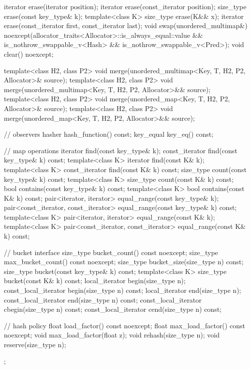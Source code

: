 \begin{codeblock}
{{    iterator  erase(iterator position);
    iterator  erase(const_iterator position);
    size_type erase(const key_type& k);
    template<class K> size_type erase(K&& x);
    iterator  erase(const_iterator first, const_iterator last);
    void      swap(unordered_multimap&)
      noexcept(allocator_traits<Allocator>::is_always_equal::value &&
               is_nothrow_swappable_v<Hash> &&
               is_nothrow_swappable_v<Pred>);
    void      clear() noexcept;

    template<class H2, class P2>
      void merge(unordered_multimap<Key, T, H2, P2, Allocator>& source);
    template<class H2, class P2>
      void merge(unordered_multimap<Key, T, H2, P2, Allocator>&& source);
    template<class H2, class P2>
      void merge(unordered_map<Key, T, H2, P2, Allocator>& source);
    template<class H2, class P2>
      void merge(unordered_map<Key, T, H2, P2, Allocator>&& source);

    // observers
    hasher hash_function() const;
    key_equal key_eq() const;

    // map operations
    iterator         find(const key_type& k);
    const_iterator   find(const key_type& k) const;
    template<class K>
      iterator       find(const K& k);
    template<class K>
      const_iterator find(const K& k) const;
    size_type        count(const key_type& k) const;
    template<class K>
      size_type      count(const K& k) const;
    bool             contains(const key_type& k) const;
    template<class K>
      bool           contains(const K& k) const;
    pair<iterator, iterator>               equal_range(const key_type& k);
    pair<const_iterator, const_iterator>   equal_range(const key_type& k) const;
    template<class K>
      pair<iterator, iterator>             equal_range(const K& k);
    template<class K>
      pair<const_iterator, const_iterator> equal_range(const K& k) const;

    // bucket interface
    size_type bucket_count() const noexcept;
    size_type max_bucket_count() const noexcept;
    size_type bucket_size(size_type n) const;
    size_type bucket(const key_type& k) const;
    template<class K> size_type bucket(const K& k) const;
    local_iterator begin(size_type n);
    const_local_iterator begin(size_type n) const;
    local_iterator end(size_type n);
    const_local_iterator end(size_type n) const;
    const_local_iterator cbegin(size_type n) const;
    const_local_iterator cend(size_type n) const;

    // hash policy
    float load_factor() const noexcept;
    float max_load_factor() const noexcept;
    void max_load_factor(float z);
    void rehash(size_type n);
    void reserve(size_type n);
  };

}
\end{codeblock}
